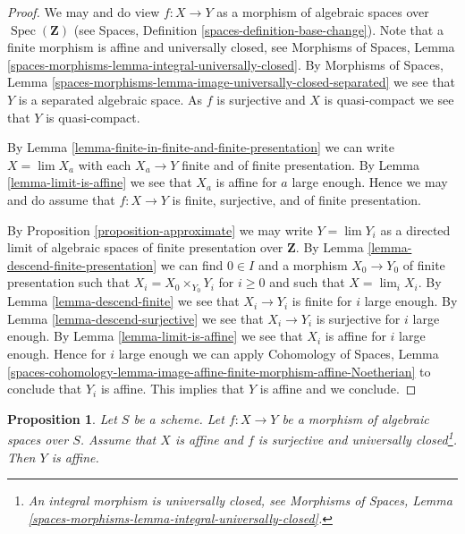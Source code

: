 \documentclass{stacks-project}
\theoremstyle{plain}
\newtheorem{proposition}[subsection]{Proposition}
\theoremstyle{definition}
\theoremstyle{remark}
\numberwithin{equation}{subsection}
\def\lim{\mathop{\mathrm{lim}}\nolimits}
\def\Spec{\mathop{\mathrm{Spec}}}
\begin{document}
\begin{proof}
We may and do view $f : X \to Y$ as a morphism of algebraic spaces over
$\Spec(\mathbf{Z})$ (see
Spaces, Definition \ref{spaces-definition-base-change}).
Note that a finite morphism is affine and universally closed, see
Morphisms of Spaces, Lemma
\ref{spaces-morphisms-lemma-integral-universally-closed}.
By Morphisms of Spaces, Lemma
\ref{spaces-morphisms-lemma-image-universally-closed-separated}
we see that $Y$ is a separated algebraic space.
As $f$ is surjective and $X$ is quasi-compact we see that $Y$ is
quasi-compact.

\medskip\noindent
By Lemma \ref{lemma-finite-in-finite-and-finite-presentation}
we can write $X = \lim X_a$ with each $X_a \to Y$ finite and of
finite presentation. By
Lemma \ref{lemma-limit-is-affine}
we see that $X_a$ is affine for $a$ large enough.
Hence we may and do assume that $f : X \to Y$ is finite, surjective, and
of finite presentation.

\medskip\noindent
By Proposition \ref{proposition-approximate} we may write
$Y = \lim Y_i$ as a directed limit of algebraic
spaces of finite presentation over $\mathbf{Z}$.
By Lemma \ref{lemma-descend-finite-presentation} we can
find $0 \in I$ and a morphism $X_0 \to Y_0$ of finite presentation
such that $X_i = X_0 \times_{Y_0} Y_i$ for $i \geq 0$
and such that $X = \lim_i X_i$. By
Lemma \ref{lemma-descend-finite}
we see that $X_i \to Y_i$ is finite for $i$ large enough.
By Lemma \ref{lemma-descend-surjective}
we see that $X_i \to Y_i$ is surjective for $i$ large enough.
By Lemma \ref{lemma-limit-is-affine} we see that $X_i$ is
affine for $i$ large enough. Hence for $i$ large enough we can apply
Cohomology of Spaces, Lemma
\ref{spaces-cohomology-lemma-image-affine-finite-morphism-affine-Noetherian}
to conclude that $Y_i$ is affine. This implies that $Y$ is affine and
we conclude.
\end{proof}

\begin{proposition}
\label{proposition-affine}
Let $S$ be a scheme. Let $f : X \to Y$ be a morphism of algebraic spaces
over $S$. Assume that $X$ is affine and $f$ is surjective and universally
closed\footnote{An integral morphism is universally closed, see
Morphisms of Spaces, Lemma
\ref{spaces-morphisms-lemma-integral-universally-closed}.}. Then $Y$ is affine.
\end{proposition}
\end{document}
